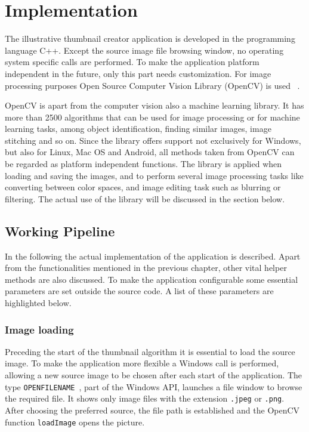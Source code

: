 \documentclass[draft,final]{vutinfth} %
\begin{document}
	\chapter{Implementation}
	\label{implementation}
	The illustrative thumbnail creator application is developed in the programming language C++.
	Except the source image file browsing window, no operating system specific calls are performed.
	To make the application platform independent in the future, only this part needs customization.
	For image processing purposes Open Source Computer Vision Library (OpenCV) is used ~\cite{opencv_library}.\par 
	OpenCV is apart from the computer vision also a machine learning library.     
	It has more than 2500 algorithms that can be used for image processing or for machine learning tasks, among object identification, finding similar images, image stitching and so on.
	Since the library offers support not exclusively for Windows, but also for Linux, Mac OS and Android, all methods taken from OpenCV can be regarded as platform independent functions.
	The library is applied when loading and saving the images, and to perform several image processing tasks like converting between color spaces, and image editing task such as blurring or filtering.
	The actual use of the library will be discussed in the section below.
	
	\section{Working Pipeline}
	In the following the actual implementation of the application is described.
	Apart from the functionalities mentioned in the previous chapter, other vital helper methods are also discussed.
	To make the application configurable some essential parameters are set outside the source code. 
	A list of these parameters are highlighted below.
	
	\subsection{Image loading}
	Preceding the start of the thumbnail algorithm it is essential to load the source image.
	To make the application more flexible a Windows call is performed, allowing a new source image to be chosen after each start of the application.
	The type \texttt{OPENFILENAME}~\cite{openfilename}, part of the Windows API, launches a file window to browse the required file.
	It shows only image files with the extension \texttt{.jpeg} or \texttt{.png}.
	After choosing the preferred source, the file path is established and the OpenCV function \texttt{loadImage} opens the picture.
	
\end{document}
